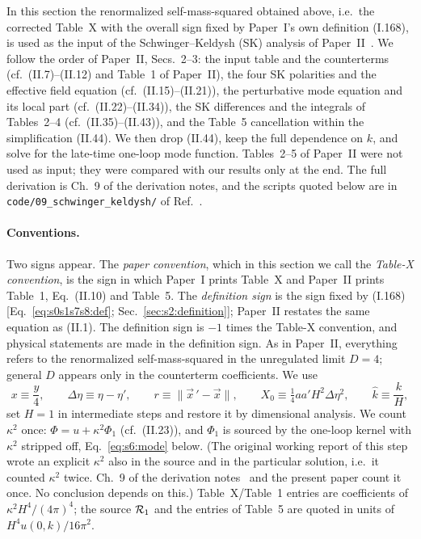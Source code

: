 \documentclass[aps,prd,onecolumn,10pt,nofootinbib,floatfix]{revtex4-2}
\newcommand{\PI}{Paper~I}
\newcommand{\PII}{Paper~II}
\newcommand{\eqI}[1]{(I.#1)}
\newcommand{\eqII}[1]{(II.#1)}
\newcommand{\khat}{\hat k}
\begin{document}
In this section the renormalized self-mass-squared obtained above, i.e.\ the corrected Table~X with the overall sign
fixed by \PI's own definition \eqI{168}, is used as the input of the Schwinger--Keldysh (SK) analysis of
\PII~\cite{KW08}. We follow the order of \PII, Secs.~2--3: the input table and the counterterms
(cf.\ \eqII{7}--\eqII{12} and Table~1 of \PII), the four SK polarities and the effective field equation
(cf.\ \eqII{15}--\eqII{21}), the perturbative mode equation and its local part (cf.\ \eqII{22}--\eqII{34}),
the SK differences and the integrals of Tables~2--4 (cf.\ \eqII{35}--\eqII{43}), and the Table~5 cancellation
within the simplification \eqII{44}. We then drop \eqII{44}, keep the full dependence on $k$, and solve for the
late-time one-loop mode function. Tables~2--5 of \PII{} were not used as input; they were compared with our results
only at the end. The full derivation is Ch.~9 of the derivation notes, and the scripts quoted below are in
\texttt{code/09\_schwinger\_keldysh/} of Ref.~\cite{ref:repo}.

\paragraph*{Conventions.}
Two signs appear. The \emph{paper convention}, which in this section we call the \emph{Table-X convention}, is the sign in
which \PI{} prints Table~X and \PII{} prints Table~1, Eq.~\eqII{10} and Table~5. The \emph{definition sign} is the sign
fixed by \eqI{168} [Eq.~\eqref{eq:s0s1s7s8:def}; Sec.~\ref{sec:s2:definition}]; \PII{} restates the same equation as \eqII{1}.
The definition sign is $-1$ times the Table-X convention, and physical statements are made in the definition sign.
As in \PII, everything refers to the renormalized self-mass-squared in the unregulated limit $D=4$; general $D$
appears only in the counterterm coefficients. We use
\begin{equation}
x\equiv\frac y4,\qquad \Delta\eta\equiv\eta-\eta',\qquad r\equiv\|\vec x\,'-\vec x\|,\qquad
X_0\equiv\tfrac14aa'H^2\Delta\eta^2,\qquad \khat\equiv\frac kH,
\label{eq:s6:notation}
\end{equation}
set $H=1$ in intermediate steps and restore it by dimensional analysis. We count $\kappa^2$ once: $\Phi=u+\kappa^2\Phi_1$
(cf.\ \eqII{23}), and $\Phi_1$ is sourced by the one-loop kernel with $\kappa^2$ stripped off, Eq.~\eqref{eq:s6:mode}
below. (The original working report of this step wrote an explicit $\kappa^2$ also in the source and in the particular solution,
i.e.\ it counted $\kappa^2$ twice. Ch.~9 of the derivation notes~\cite{ref:repo} and the present paper count it once. No conclusion
depends on this.)
Table~X/Table~1 entries are coefficients of $\kappa^2H^4/(4\pi)^4$; the source $\mathcal{R}_1$ and the entries of Table~5 are
quoted in units of $H^4u(0,k)/16\pi^2$.
\end{document}
